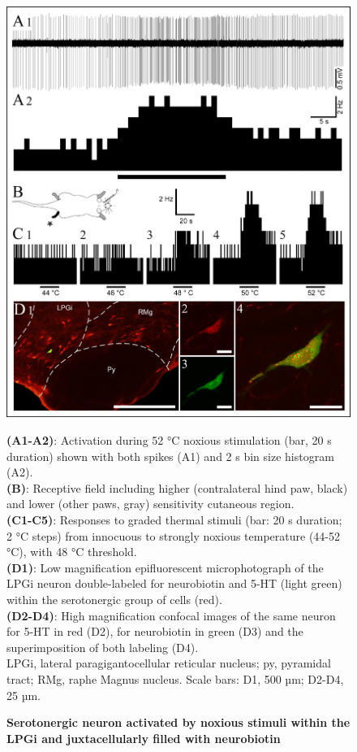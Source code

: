 \documentclass[a4paper,12pt,twoside]{report}
\begin{document}
\begin{figure}[p]

\begin{center}
 \includegraphics[scale=0.9]{Article3-FIG2.jpg} 
\end{center}

\caption[LPGi 5-HT neuron activated by noxious stimuli]{\textbf{Serotonergic neuron activated by noxious stimuli within the LPGi and juxtacellularly filled with neurobiotin}}

{\protect\parbox[t]{18cm}{
\begin{small}
\textbf{(A1-A2)}: Activation during 52 °C noxious stimulation (bar, 20 s duration) shown with both spikes (A1) and 2 s bin size histogram (A2).\\ 
\textbf{(B)}: Receptive field including higher (contralateral hind paw, black) and lower (other paws, gray) sensitivity cutaneous region.\\ 
\textbf{(C1-C5)}: Responses to graded thermal stimuli (bar: 20 s duration; 2 °C steps) from innocuous to strongly noxious temperature (44-52 °C), with 48 °C threshold.\\ 
\textbf{(D1)}: Low magnification epifluorescent microphotograph of the LPGi neuron double-labeled for neurobiotin and 5-HT (light green) within the serotonergic group of cells (red).\\ 
\textbf{(D2-D4)}: High magnification confocal images of the same neuron for 5-HT in red (D2), for neurobiotin in green (D3) and the superimposition of both labeling (D4).\\ 
LPGi, lateral paragigantocellular reticular nucleus; py, pyramidal tract; RMg, raphe Magnus nucleus. Scale bars: D1, 500 µm; D2-D4, 25 µm.
\end{small}}}


\end{figure}
\end{document}

